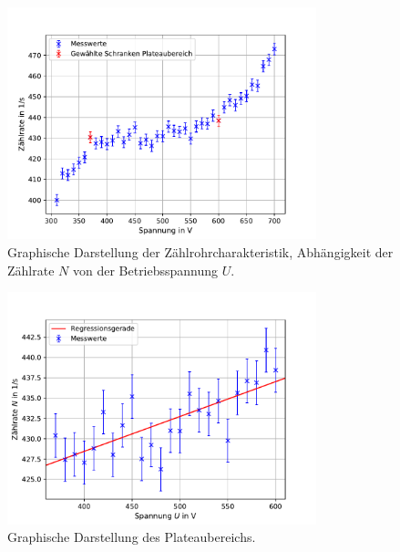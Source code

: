 \newpage

\begin{figure}
  \centering
  \includegraphics[width = 0.8\textwidth]{../Messdaten/plots/all_counts.pdf}
  \caption{Graphische Darstellung der Zählrohrcharakteristik, Abhängigkeit der Zählrate $N$ von der Betriebsspannung $U$.}
  \label{fig: zählrate_ges}
\end{figure}
\begin{figure}
  \centering
  \includegraphics[width = 0.8\textwidth]{../Messdaten/plots/plateau.pdf}
  \caption{Graphische Darstellung des Plateaubereichs.}
  \label{fig: plateau}
\end{figure}
